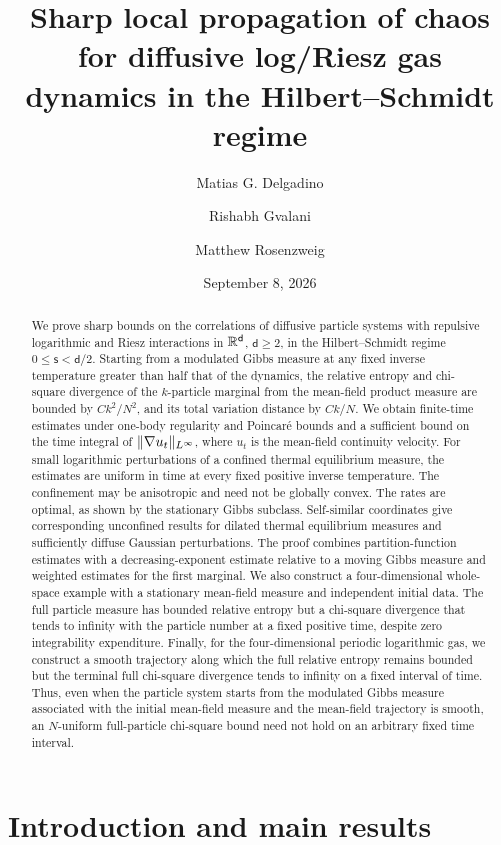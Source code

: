 \documentclass[11pt,reqno]{amsart}
\title[Sharp local chaos for diffusive log/Riesz dynamics]{Sharp local propagation of chaos for diffusive log/Riesz gas dynamics in the Hilbert--Schmidt regime}
\author[M. G. Delgadino]{Matias G. Delgadino}
\author[R. Gvalani]{Rishabh Gvalani}
\author[M. Rosenzweig]{Matthew Rosenzweig}
\date{September 8, 2026}
\numberwithin{equation}{section}
\theoremstyle{plain}
\theoremstyle{remark}
\DeclarePairedDelimiter{\norm}{\lVert}{\rVert}
\renewcommand{\d}{\mathsf{d}}\newcommand{\s}{\mathsf{s}}
\begin{document}
\raggedbottom
\begin{abstract}

{We prove sharp bounds on the correlations of diffusive particle systems with repulsive logarithmic and Riesz interactions in $\R^\d$, $\d\ge2$, in the Hilbert--Schmidt regime $0\le\s<\d/2$.} Starting from a modulated Gibbs measure at any fixed inverse temperature greater than half that of the dynamics, the relative entropy and chi-square divergence of the $k$-particle marginal from the mean-field product measure are bounded by $Ck^2/N^2$, and its total variation distance by $Ck/N$. We obtain finite-time estimates under one-body regularity and Poincar\'e bounds and a sufficient bound on the time integral of $\norm{\nabla u_t}_{L^\infty}$, where $u_t$ is the mean-field continuity velocity. For small logarithmic perturbations of a confined thermal equilibrium measure, the estimates are uniform in time at every fixed positive inverse temperature. The confinement may be anisotropic and need not be globally convex. The rates are optimal, as shown by the stationary Gibbs subclass. Self-similar coordinates give corresponding unconfined results for dilated thermal equilibrium measures and sufficiently diffuse Gaussian perturbations. The proof combines partition-function estimates with a decreasing-exponent estimate relative to a moving Gibbs measure and weighted estimates for the first marginal. We also construct a four-dimensional whole-space example with a stationary mean-field measure and independent initial data. The full particle measure has bounded relative entropy but a chi-square divergence that tends to infinity with the particle number at a fixed positive time, despite zero integrability expenditure. Finally, for the four-dimensional periodic logarithmic gas, we construct a smooth trajectory along which the full relative entropy remains bounded but the terminal full chi-square divergence tends to infinity on a fixed interval of time. Thus, even when the particle system starts from the modulated Gibbs measure associated with the initial mean-field measure and the mean-field trajectory is smooth, an $N$-uniform full-particle chi-square bound need not hold on an arbitrary fixed time interval.
\end{abstract}

\maketitle
\begingroup

\section{Introduction and main results}\label{sec:intro}
\end{document}
